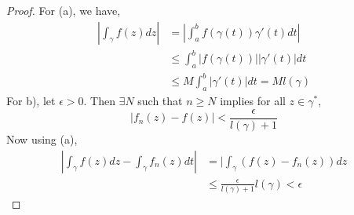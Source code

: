\documentclass[12pt]{amsart}
\begin{document}
\begin{proof}
    For (a), we have, 
    \begin{align*}
        | \int_\gamma f(z)dz| &= |\int_a^b f(\gamma(t))\gamma'(t)dt| \\
        &\leq \int_a^b |f(\gamma(t))||\gamma'(t)| dt \\
        &\leq M\int_a^b |\gamma'(t)|dt = Ml(\gamma)
    \end{align*}
    For b), let $\epsilon > 0$. Then $\exists N$ such that $n \geq N$ implies for all $z \in \gamma^*$, 
    \[ |f_n(z)-f(z)| < \frac{\epsilon}{l(\gamma)+1}\]
    Now using (a), 
    \begin{align*}
        |\int_\gamma f(z)dz -\int_\gamma f_n(z)dt | &= |\int_\gamma (f(z)-f_n(z))dz  \\
        &\leq \frac{\epsilon}{l(\gamma)+1}l(\gamma) < \epsilon
    \end{align*}

\end{proof}
\end{document}
